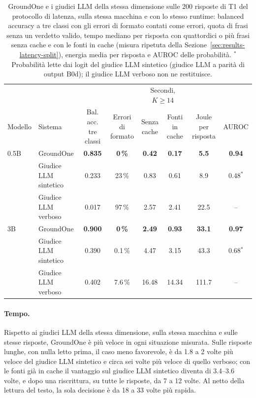 \begin{table}[htbp]
\centering
\caption{GroundOne e i giudici LLM della stessa dimensione sulle 200 risposte di T1 del protocollo di latenza, sulla
stessa macchina e con lo stesso runtime: balanced accuracy a tre classi con gli errori di formato contati come errori,
quota di frasi senza un verdetto valido, tempo mediano per risposta con quattordici o più frasi senza cache e con le
fonti in cache (misura ripetuta della Sezione~\ref{sec:results-latency-split}), energia media per risposta e AUROC delle
probabilità. $^{*}$Probabilità lette dai logit del giudice LLM sintetico (giudice LLM a parità di output B0d); il giudice
LLM verboso non ne restituisce.}
\label{tab:results-summary-device}
\small
\setlength{\tabcolsep}{3pt}
\begin{tabular}{llcccccc}
\toprule
 & & & & \multicolumn{2}{c}{Secondi, $K \geq 14$} & & \\
\cmidrule(lr){5-6}
Modello & Sistema & \makecell{Bal. acc.\\tre classi} & \makecell{Errori di\\formato} & \makecell{Senza\\cache} & \makecell{Fonti\\in cache} & \makecell{Joule per\\risposta} & AUROC \\
\midrule
0.5B & GroundOne & \textbf{0.835} & \textbf{0\,\%} & \textbf{0.42} & \textbf{0.17} & \textbf{5.5} & \textbf{0.94} \\
 & \makecell[l]{Giudice LLM\\sintetico} & 0.233 & 23\,\% & 0.83 & 0.61 & 8.9 & 0.48$^{*}$ \\
 & \makecell[l]{Giudice LLM\\verboso} & 0.017 & 97\,\% & 2.57 & 2.41 & 22.5 & -- \\
\midrule
3B & GroundOne & \textbf{0.900} & \textbf{0\,\%} & \textbf{2.49} & \textbf{0.93} & \textbf{33.1} & \textbf{0.97} \\
 & \makecell[l]{Giudice LLM\\sintetico} & 0.390 & 0.1\,\% & 4.47 & 3.15 & 43.3 & 0.68$^{*}$ \\
 & \makecell[l]{Giudice LLM\\verboso} & 0.402 & 7.6\,\% & 16.48 & 14.34 & 111.7 & -- \\
\bottomrule
\end{tabular}
\end{table}

\paragraph{Tempo.} Rispetto ai giudici LLM della stessa dimensione, sulla stessa macchina e sulle stesse risposte,
GroundOne è più veloce in ogni situazione misurata. Sulle risposte lunghe, con nulla letto prima, il caso meno
favorevole, è da 1.8 a 2 volte più veloce del giudice LLM sintetico e circa sei volte più veloce di quello verboso; con le
fonti già in cache il vantaggio sul giudice LLM sintetico diventa di 3.4--3.6 volte, e dopo una riscrittura, su tutte le
risposte, da 7 a 12 volte. Al netto della lettura del testo, la sola decisione è da 18 a 33 volte più rapida.

